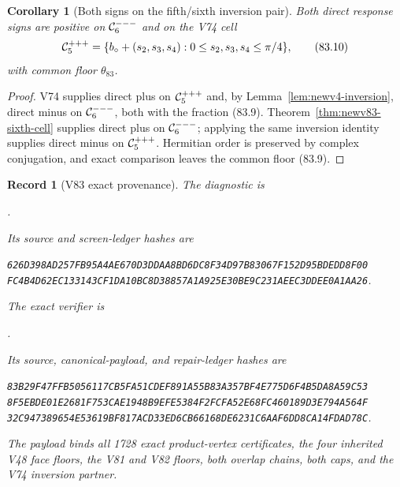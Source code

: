 \documentclass[11pt,oneside]{article}
\newtheorem{corollary}[theorem]{Corollary}
\newtheorem{record}[theorem]{Record}
\theoremstyle{definition}
\theoremstyle{remark}
\begin{document}
\begin{corollary}[Both signs on the fifth/sixth inversion pair]
\label{cor:newv83-paired-cells}
Both direct response signs are positive on \({\cal C}^{---}_6\)
and on the V74 cell
\[
 {\cal C}^{+++}_5=
 \{b_\circ+(s_2,s_3,s_4):
      0\leq s_2,s_3,s_4\leq\pi/4\},                   \tag{83.10}
\]
with common floor \(\theta_{83}\).
\end{corollary}

\begin{proof}
V74 supplies direct plus on \({\cal C}^{+++}_5\) and, by
Lemma~\ref{lem:newv4-inversion}, direct minus on
\({\cal C}^{---}_6\), both with the fraction (83.9).
Theorem~\ref{thm:newv83-sixth-cell} supplies direct plus on
\({\cal C}^{---}_6\); applying the same inversion identity supplies
direct minus on \({\cal C}^{+++}_5\).  Hermitian order is preserved
by complex conjugation, and exact comparison leaves the common
floor (83.9).
\end{proof}

\begin{record}[V83 exact provenance]
\label{rec:newv83-provenance}
The diagnostic is
\begin{center}\footnotesize
{}.
\end{center}
Its source and screen-ledger hashes are
\begin{center}\scriptsize
\texttt{626D398AD257FB95A4AE670D3DDAA8BD6DC8F34D97B83067F152D95BDEDD8F00}\\
\texttt{FC4B4D62EC133143CF1DA10BC8D38857A1A925E30BE9C231AEEC3DDEE0A1AA26}.
\end{center}
The exact verifier is
\begin{center}\footnotesize
{}.
\end{center}
Its source, canonical-payload, and repair-ledger hashes are
\begin{center}\scriptsize
\texttt{83B29F47FFB5056117CB5FA51CDEF891A55B83A357BF4E775D6F4B5DA8A59C53}\\
\texttt{8F5EBDE01E2681F753CAE1948B9EFE5384F2FCFA52E68FC460189D3E794A564F}\\
\texttt{32C947389654E53619BF817ACD33ED6CB66168DE6231C6AAF6DD8CA14FDAD78C}.
\end{center}
The payload binds all 1728 exact product-vertex certificates, the
four inherited V48 face floors, the V81 and V82 floors, both overlap
chains, both caps, and the V74 inversion partner.
\end{record}
\end{document}

